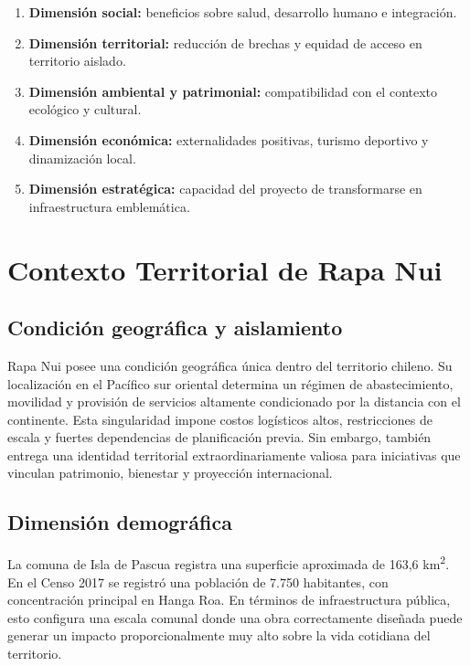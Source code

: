 \documentclass[12pt,letterpaper]{article}
\begin{document}
\begin{enumerate}
    \item \textbf{Dimensión social:} beneficios sobre salud, desarrollo humano e integración.
    \item \textbf{Dimensión territorial:} reducción de brechas y equidad de acceso en territorio aislado.
    \item \textbf{Dimensión ambiental y patrimonial:} compatibilidad con el contexto ecológico y cultural.
    \item \textbf{Dimensión económica:} externalidades positivas, turismo deportivo y dinamización local.
    \item \textbf{Dimensión estratégica:} capacidad del proyecto de transformarse en infraestructura emblemática.
\end{enumerate}

\section{Contexto Territorial de Rapa Nui}

\subsection{Condición geográfica y aislamiento}

Rapa Nui posee una condición geográfica única dentro del territorio chileno. Su localización en el Pacífico sur oriental determina un régimen de abastecimiento, movilidad y provisión de servicios altamente condicionado por la distancia con el continente. Esta singularidad impone costos logísticos altos, restricciones de escala y fuertes dependencias de planificación previa. Sin embargo, también entrega una identidad territorial extraordinariamente valiosa para iniciativas que vinculan patrimonio, bienestar y proyección internacional.

\subsection{Dimensión demográfica}

La comuna de Isla de Pascua registra una superficie aproximada de 163,6 km\textsuperscript{2}. En el Censo 2017 se registró una población de 7.750 habitantes, con concentración principal en Hanga Roa. En términos de infraestructura pública, esto configura una escala comunal donde una obra correctamente diseñada puede generar un impacto proporcionalmente muy alto sobre la vida cotidiana del territorio.
\end{document}

